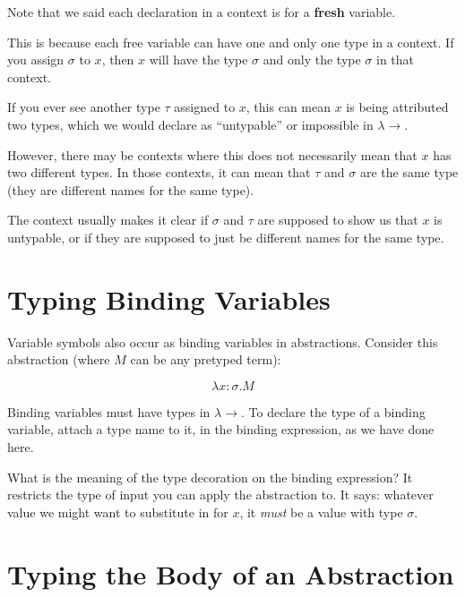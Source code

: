 \documentclass{book}
\numberwithin{equation}{chapter}
\newcommand{\vocab}{\textbf}
\begin{document}
Note that we said each declaration in a context is for a \vocab{fresh} variable. 

This is because each free variable can have one and only one type in a context. If you assign $\sigma$ to $x$, then $x$ will have the type $\sigma$ and only the type $\sigma$ in that context.

If you ever see another type $\tau$ assigned to $x$, this can mean $x$ is being attributed two types, which we would declare as ``untypable'' or impossible in $\lambda\rightarrow$. 

However, there may be contexts where this does not necessarily mean that $x$ has two different types. In those contexts, it can mean that $\tau$ and $\sigma$ are the same type (they are different names for the same type).

The context usually makes it clear if $\sigma$ and $\tau$ are supposed to show us that $x$ is untypable, or if they are supposed to just be different names for the same type.


\section{Typing Binding Variables}

Variable symbols also occur as binding variables in abstractions. Consider this abstraction (where $M$ can be any pretyped term):

\begin{equation}
\lambda x : \sigma.M
\end{equation}

\noindent
Binding variables must have types in $\lambda\rightarrow$. To declare the type of a binding variable, attach a type name to it, in the binding expression, as we have done here.

What is the meaning of the type decoration on the binding expression? It restricts the type of input you can apply the abstraction to. It says: whatever value we might want to substitute in for $x$, it \textit{must} be a value with type $\sigma$.


\section{Typing the Body of an Abstraction}
\end{document}
